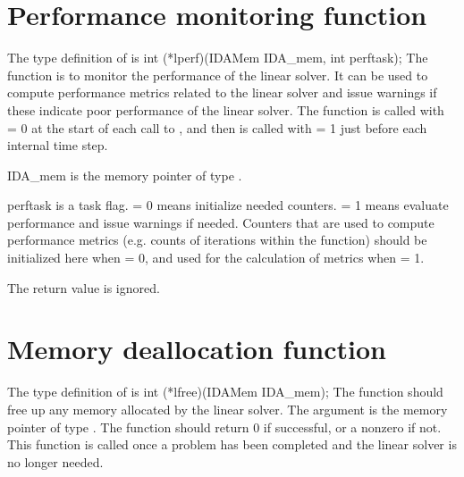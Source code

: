 
\section{Performance monitoring function}
The type definition of  is
{
  int (*lperf)(IDAMem IDA\_mem, int perftask);
}
{
  The  function is to monitor the performance of the linear solver.
  It can be used to compute performance metrics related to the linear solver
  and issue warnings if these indicate poor performance of the linear solver.
  The  function is called with  = 0 at the start of
  each call to , and then is called with  = 1 just
  before each internal time step.
}
{
  \begin{args}
  \item[IDA\_mem]
    is the {\ida} memory pointer of type .
  \item[perftask]
    is a task flag.   = 0 means initialize needed counters.
     = 1 means evaluate performance and issue warnings if needed.
    Counters that are used to compute performance metrics (e.g. counts of
    iterations within the  function) should be initialized here when
     = 0, and used for the calculation of metrics when
     = 1.
  \end{args}
}
{
  The  return value is ignored.
}
{}


\section{Memory deallocation function}
The type definition of  is
{
  int (*lfree)(IDAMem IDA\_mem);
}
{
  The  function should free up any memory allocated by the linear
  solver.
}
{
  The argument  is the {\ida} memory pointer of type .
}
{
  The  function should return 0 if successful, or a nonzero
  if not.
}
{
  This function is called once a problem has been completed and the 
  linear solver is no longer needed.
}
